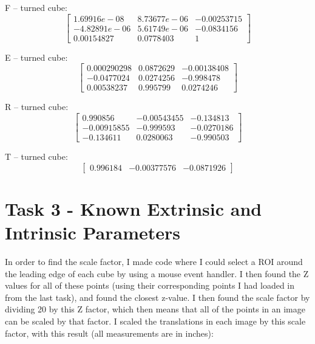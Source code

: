\documentclass[10pt,a4paper]{article}
\begin{document}
F -- turned cube: 
\begin{equation*}
\begin{bmatrix}
1.69916e-08 & 8.73677e-06 & -0.00253715 \\ -4.82891e-06 & 5.61749e-06 & -0.0834156 \\ 0.00154827 & 0.0778403 & 1
\end{bmatrix}
\end{equation*}

E -- turned cube: 
\begin{equation*}
\begin{bmatrix}
0.000290298 & 0.0872629 & -0.00138408 \\ -0.0477024 & 0.0274256 & -0.998478 \\ 0.00538237 & 0.995799 & 0.0274246
\end{bmatrix}
\end{equation*}

R -- turned cube: 
\begin{equation*}
\begin{bmatrix}
0.990856 & -0.00543455 & -0.134813 \\ -0.00915855 & -0.999593 & -0.0270186 \\ -0.134611 & 0.0280063 & -0.990503
\end{bmatrix}
\end{equation*}

T -- turned cube: 
\begin{equation*}
\begin{bmatrix}
0.996184 & -0.00377576 & -0.0871926
\end{bmatrix}
\end{equation*}

\section*{Task 3 - Known Extrinsic and Intrinsic Parameters}

In order to find the scale factor, I made code where I could select a ROI around the leading edge of each cube by using a mouse event handler. I then found the Z values for all of these points (using their corresponding points I had loaded in from the last task), and found the closest z-value. I then found the scale factor by dividing 20 by this Z factor, which then means that all of the points in an image can be scaled by that factor. I scaled the translations in each image by this scale factor, with this result (all measurements are in inches): 
\end{document}
